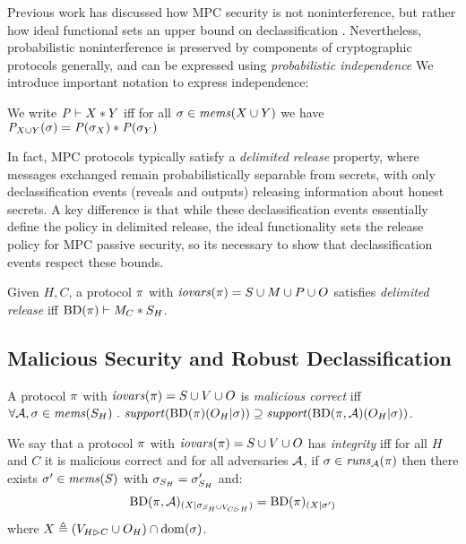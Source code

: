 Previous work has discussed how MPC security is not noninterference,
but rather how ideal functional sets an upper bound on
declassification \cite{6266151,almeida2018enforcing}. Nevertheless,
probabilistic noninterference is preserved by components of
cryptographic protocols generally, and can be expressed using
\emph{probabilistic independence} \cite{darais2019language,barthe2019probabilistic}
We introduce important notation to express independence:
\begin{definition}
  We write $\mathit{P} \vdash X * Y$ iff for all
    $\sigma \in \mathit{mems}(X \cup Y)$ we have
  ${\mathit{P}}_{X \cup Y}(\sigma) =
  \mathit{P}(\sigma_X) * \mathit{P}(\sigma_Y)$
\end{definition}

In fact, MPC protocols typically satisfy a \emph{delimited release}
property\cite{XXX}, where messages exchanged remain probabilistically separable
from secrets, with only declassification events (reveals and outputs)
releasing information about honest secrets. A key difference is that while
these declassification events essentially define the policy in delimited
release, the ideal functionality sets the release policy for MPC
passive security, so its necessary to show that declassification events respect
these bounds.
\begin{definition}
  Given $H,C$, a protocol $\pi$ with $\mathit{iovars}(\pi) = S \cup M \cup P \cup O$
  satisfies \emph{delimited release} iff
  $\mathrm{BD}(\pi) \vdash M_C * S_H$.
\end{definition}

\subsection{Malicious Security and Robust Declassification}

\begin{definition}
  A protocol $\pi$ with $\mathit{iovars}(\pi) = S \cup V \cup O$ is \emph{malicious correct} iff
  $
  \forall \adversary, \store \in \mems(S_H) \ .\ \support(\progtt(\prog)(O_H|\store)) \supseteq
    \support(\progtt(\prog,\adversary)(O_H|\store))
  $.
\end{definition}

\begin{definition}[Integrity]
  We say that a protocol $\pi$ with $\mathit{iovars}(\pi) = S \cup V \cup O$ has
  \emph{integrity} iff for all $H$ and $C$ 
  it is malicious correct and for all adversaries $\mathcal{A}$,
  if $\sigma \in \mathit{runs}_{\mathcal{A}}(\pi)$ 
  then there exists $\sigma' \in \mathit{mems}(S)$ with $\sigma_{S_H} = \sigma'_{S_H} $ and:
    $$
    \mathrm{BD}(\pi,\mathcal{A})_{({X}|{\sigma_{S_H \cup V_{C \rhd H}}})} =
    \mathrm{BD}(\pi)_{({X}|{\sigma'})}
    $$ 
  where $X \triangleq (V_{H \rhd C} \cup O_H) \cap \mathrm{dom}(\sigma)$. 
\end{definition}

